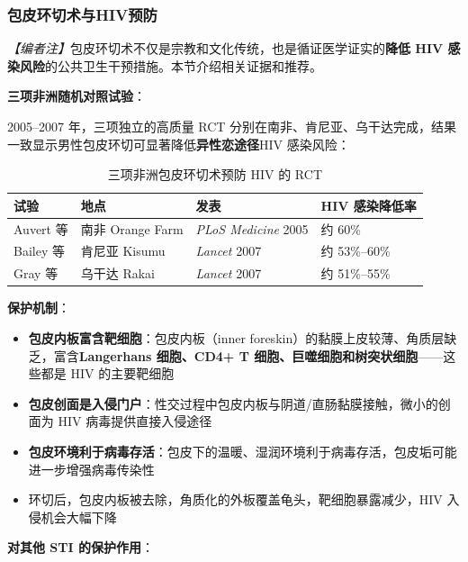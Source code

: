 \subsubsection{包皮环切术与HIV预防}
\label{subsec:circumcision_hiv}

\noindent\textit{【编者注】}包皮环切术不仅是宗教和文化传统，也是循证医学证实的\textbf{降低 HIV 感染风险}的公共卫生干预措施。本节介绍相关证据和推荐。

\vspace{0.5em}
\noindent\textbf{三项非洲随机对照试验}：

2005--2007 年，三项独立的高质量 RCT 分别在南非、肯尼亚、乌干达完成，结果一致显示男性包皮环切可显著降低\textbf{异性恋途径}HIV 感染风险：

\begin{table}[htbp]
\centering
\caption{三项非洲包皮环切术预防 HIV 的 RCT}
\label{tab:circumcision_hiv_rct}
\begin{tabularx}{\textwidth}{@{}llXX@{}}
    \toprule
    \textbf{试验} & \textbf{地点} & \textbf{发表} & \textbf{HIV 感染降低率} \\
    \midrule
    Auvert 等 & 南非 Orange Farm & \textit{PLoS Medicine} 2005 & 约 60\% \\
    Bailey 等 & 肯尼亚 Kisumu & \textit{Lancet} 2007 & 约 53\%--60\% \\
    Gray 等 & 乌干达 Rakai & \textit{Lancet} 2007 & 约 51\%--55\% \\
    \bottomrule
\end{tabularx}
\end{table}

\vspace{0.5em}
\noindent\textbf{保护机制}：

\begin{itemize}[leftmargin=2cm]
	\item \textbf{包皮内板富含靶细胞}：包皮内板（inner foreskin）的黏膜上皮较薄、角质层缺乏，富含\textbf{Langerhans 细胞、CD4+ T 细胞、巨噬细胞和树突状细胞}——这些都是 HIV 的主要靶细胞
	\item \textbf{包皮创面是入侵门户}：性交过程中包皮内板与阴道/直肠黏膜接触，微小的创面为 HIV 病毒提供直接入侵途径
	\item \textbf{包皮环境利于病毒存活}：包皮下的温暖、湿润环境利于病毒存活，包皮垢可能进一步增强病毒传染性
	\item 环切后，包皮内板被去除，角质化的外板覆盖龟头，靶细胞暴露减少，HIV 入侵机会大幅下降
\end{itemize}

\vspace{0.5em}
\noindent\textbf{对其他 STI 的保护作用}：

